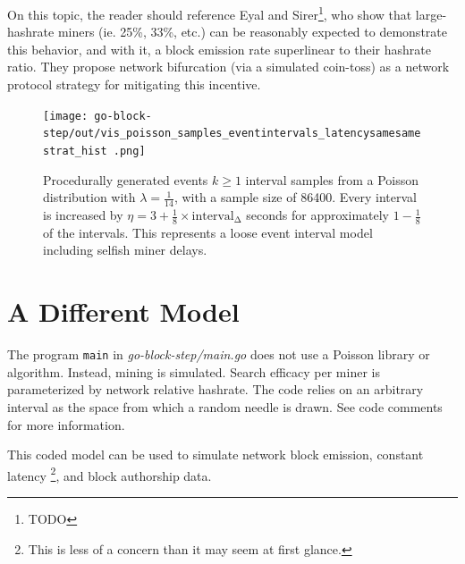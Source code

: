 \documentclass[11pt]{article}
\theoremstyle{plain}
\begin{document}
On this topic, the reader should reference Eyal and Sirer\footnote{TODO}, who
show that large-hashrate miners (ie. 25\%, 33\%, etc.) can be reasonably
expected to demonstrate this behavior, and with it, a block emission
rate superlinear to their hashrate ratio. They propose network bifurcation
(via a simulated coin-toss) as a network protocol strategy for mitigating
this incentive.

\begin{figure}[tph]
    \centering

    \texttt{[image: go-block-step/out/vis\_poisson\_samples\_eventintervals\_latencysamesamestrat\_hist
    .png]}
    \caption{
        Procedurally generated events $k \geq 1$ interval samples from a Poisson distribution
        with $\lambda = \frac{1}{14}$, with a sample size of 86400.
        Every interval is increased by $\eta=3 + \frac{1}{8} \times \mathrm{interval_{\Delta}}$ seconds for approximately
        $1-\frac{1}{8}$ of the intervals.
        This represents a loose event interval model including selfish miner delays.
    }
\end{figure}


%
%


\section{\normalsize{A Different Model}}

The program \texttt{main} in \textit{go-block-step/main.go} does not use
a Poisson library or algorithm.
Instead, mining is simulated.
Search efficacy per miner is parameterized by network relative hashrate.
The code relies on an arbitrary interval as the space from which a random needle
is drawn. See code comments for more information.

This coded model can be used to simulate network block emission, constant latency\nolinebreak
\footnote{This is less of a concern than it may seem at first glance.}, and
block authorship data.
\end{document}
